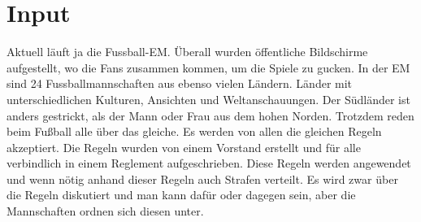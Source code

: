 \documentclass{../inc/mybib}
\begin{document}
\section{ Input }
\begin{spacing}{1.5}
Aktuell läuft ja die Fussball-EM. Überall wurden öffentliche Bildschirme aufgestellt, wo die Fans zusammen kommen, um die Spiele zu gucken. 
In der EM sind 24 Fussballmannschaften aus ebenso vielen Ländern. Länder mit unterschiedlichen Kulturen, Ansichten und Weltanschauungen. Der Südländer ist anders gestrickt, als der Mann oder Frau aus dem hohen Norden. Trotzdem reden beim Fußball alle über das gleiche. Es werden von allen die gleichen Regeln akzeptiert. Die Regeln wurden von einem Vorstand erstellt und für alle verbindlich in einem Reglement aufgeschrieben. Diese Regeln werden angewendet und wenn nötig anhand dieser Regeln auch Strafen verteilt. Es wird zwar über die Regeln diskutiert und man kann dafür oder dagegen sein, aber die Mannschaften ordnen sich diesen unter.


\end{spacing}
\end{document}
